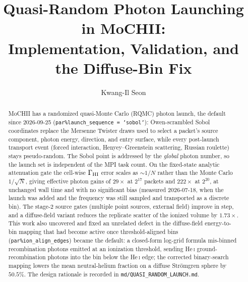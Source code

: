 \documentclass[english,a4paper]{my_memo}
\newcommand{\code}[1]{\texttt{#1}}
\begin{document}
\title{Quasi-Random Photon Launching in MoCHII:\\
       Implementation, Validation, and the Diffuse-Bin Fix}
\author{Kwang-Il Seon}
\date{\docmoddate}
\maketitle

\begin{abstract}
MoCHII has a randomized quasi-Monte Carlo (RQMC) photon launch, the default
since 2026-09-25 (\code{par\%launch\_sequence = 'sobol'}):
Owen-scrambled Sobol coordinates replace the Mersenne Twister draws used to
select a packet's source component, photon energy, direction, and entry
surface, while every post-launch transport event (forced interaction,
Henyey--Greenstein scattering, Russian roulette) stays pseudo-random.  The
Sobol point is addressed by the \emph{global} photon number, so the launch set
is independent of the MPI task count.  On the fixed-state analytic attenuation
gate the cell-wise $\Gamma_{\rm HI}$ error scales as $\sim 1/N$ rather than the
Monte Carlo $1/\sqrt{N}$, giving effective photon gains of $29\times$ at
$2^{17}$ packets and $222\times$ at $2^{20}$, at unchanged wall time and with no
significant bias (measured 2026-07-18, when the launch was added and the
frequency was still sampled and transported as a discrete bin).  The stage-2 source gates (multiple point sources, external
field) improve in step, and a diffuse-field variant reduces the replicate
scatter of the ionized volume by $1.73\times$.  This work also uncovered and
fixed an unrelated defect in the diffuse-field energy-to-bin mapping that had
become active once threshold-aligned bins (\code{par\%ion\_align\_edges})
became the default: a closed-form log-grid formula mis-binned recombination
photons emitted at an ionization threshold, sending He\,\textsc{i}
ground-recombination photons into the bin below the He\,\textsc{i} edge; the
corrected binary-search mapping lowers the mean neutral-helium fraction on a
diffuse Str\"omgren sphere by $50.5\%$.  The design rationale is recorded in
\code{md/QUASI\_RANDOM\_LAUNCH.md}.
\end{abstract}

\tableofcontents

\end{document}
